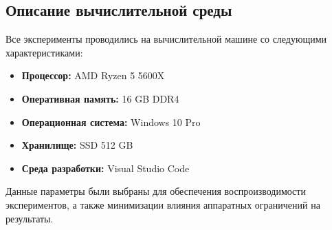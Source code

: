 \subsection*{Описание вычислительной среды}  
Все эксперименты проводились на вычислительной машине со следующими характеристиками:  
\begin{itemize}  
    \item \textbf{Процессор:} AMD Ryzen 5 5600X  
    \item \textbf{Оперативная память:} 16 GB DDR4  
    \item \textbf{Операционная система:} Windows 10 Pro  
    \item \textbf{Хранилище:} SSD 512 GB  
    \item \textbf{Среда разработки:} Visual Studio Code  
\end{itemize}  

Данные параметры были выбраны для обеспечения воспроизводимости экспериментов, а также минимизации влияния аппаратных ограничений на результаты.